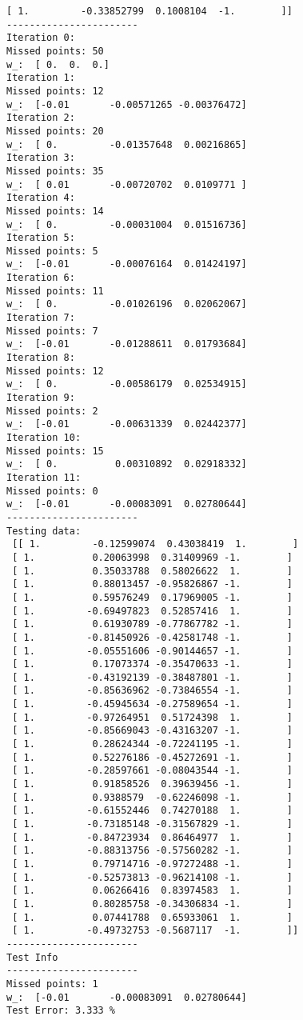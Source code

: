 \documentclass{article}
\begin{document}
\begin{lstlisting}[breaklines=true,basicstyle=\small]
 [ 1.         -0.33852799  0.1008104  -1.        ]]
-----------------------
Iteration 0: 
Missed points: 50
w_:  [ 0.  0.  0.]
Iteration 1: 
Missed points: 12
w_:  [-0.01       -0.00571265 -0.00376472]
Iteration 2: 
Missed points: 20
w_:  [ 0.         -0.01357648  0.00216865]
Iteration 3: 
Missed points: 35
w_:  [ 0.01       -0.00720702  0.0109771 ]
Iteration 4: 
Missed points: 14
w_:  [ 0.         -0.00031004  0.01516736]
Iteration 5: 
Missed points: 5
w_:  [-0.01       -0.00076164  0.01424197]
Iteration 6: 
Missed points: 11
w_:  [ 0.         -0.01026196  0.02062067]
Iteration 7: 
Missed points: 7
w_:  [-0.01       -0.01288611  0.01793684]
Iteration 8: 
Missed points: 12
w_:  [ 0.         -0.00586179  0.02534915]
Iteration 9: 
Missed points: 2
w_:  [-0.01       -0.00631339  0.02442377]
Iteration 10: 
Missed points: 15
w_:  [ 0.          0.00310892  0.02918332]
Iteration 11: 
Missed points: 0
w_:  [-0.01       -0.00083091  0.02780644]
-----------------------
Testing data:
 [[ 1.         -0.12599074  0.43038419  1.        ]
 [ 1.          0.20063998  0.31409969 -1.        ]
 [ 1.          0.35033788  0.58026622  1.        ]
 [ 1.          0.88013457 -0.95826867 -1.        ]
 [ 1.          0.59576249  0.17969005 -1.        ]
 [ 1.         -0.69497823  0.52857416  1.        ]
 [ 1.          0.61930789 -0.77867782 -1.        ]
 [ 1.         -0.81450926 -0.42581748 -1.        ]
 [ 1.         -0.05551606 -0.90144657 -1.        ]
 [ 1.          0.17073374 -0.35470633 -1.        ]
 [ 1.         -0.43192139 -0.38487801 -1.        ]
 [ 1.         -0.85636962 -0.73846554 -1.        ]
 [ 1.         -0.45945634 -0.27589654 -1.        ]
 [ 1.         -0.97264951  0.51724398  1.        ]
 [ 1.         -0.85669043 -0.43163207 -1.        ]
 [ 1.          0.28624344 -0.72241195 -1.        ]
 [ 1.          0.52276186 -0.45272691 -1.        ]
 [ 1.         -0.28597661 -0.08043544 -1.        ]
 [ 1.          0.91858526  0.39639456 -1.        ]
 [ 1.          0.9388579  -0.62246098 -1.        ]
 [ 1.         -0.61552446  0.74270188  1.        ]
 [ 1.         -0.73185148 -0.31567829 -1.        ]
 [ 1.         -0.84723934  0.86464977  1.        ]
 [ 1.         -0.88313756 -0.57560282 -1.        ]
 [ 1.          0.79714716 -0.97272488 -1.        ]
 [ 1.         -0.52573813 -0.96214108 -1.        ]
 [ 1.          0.06266416  0.83974583  1.        ]
 [ 1.          0.80285758 -0.34306834 -1.        ]
 [ 1.          0.07441788  0.65933061  1.        ]
 [ 1.         -0.49732753 -0.5687117  -1.        ]]
-----------------------
Test Info
-----------------------
Missed points: 1
w_:  [-0.01       -0.00083091  0.02780644]
Test Error: 3.333 %
\end{lstlisting}
\end{document}
